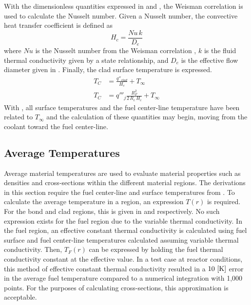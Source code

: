      With the dimensionless quantities expressed in  and
      , the Weisman correlation is used to calculate the Nusselt
      number. Given a Nusselt number, the convective heat transfer coefficient
      is defined as
      \begin{equation}
        \label{eq:hc}
        H_c = \frac{N\!u \, k}{D_e}
      \end{equation}
      where $Nu$ is the Nusselt number from the Weisman correlation
      , $k$ is the fluid thermal conductivity given by a state
      relationship, and $D_e$ is the effective flow diameter given in
      . Finally, the clad surface temperature is expressed.
      \begin{align}
        T_C &= \frac{q''_{clad}}{H_c} + T_{\infty} \\
        \label{eq:tc}
        T_C &= q'''_j \frac{R_F^2}{2\,R_c\,H_c} + T_{\infty}
      \end{align}
      With , all surface temperatures and the fuel center-line
      temperature have been related to $T_{\infty}$ and the calculation of these
      quantities may begin, moving from the coolant toward the fuel center-line.

  \subsection{Average Temperatures}
    \label{sec:average_temps}
    Average material temperatures are used to evaluate material properties such
    as densities and cross-sections within the different material regions. The
    derivations in this section require the fuel center-line and surface
    temperatures from . To calculate the average
    temperature in a region, an expression $T(r)$ is required. For the bond and
    clad regions, this is given in  and  respectively.
    No such expression exists for the fuel region due to the variable thermal
    conductivity. In the fuel region, an effective constant thermal conductivity
    is calculated using fuel surface and fuel center-line temperatures
    calculated assuming variable thermal conductivity. Then, $T_F(r)$ can be 
    expressed by holding the fuel thermal conductivity constant at the effective
    value. In a test case at reactor conditions, this method of effective 
    constant thermal conductivity resulted in a $10 \,\left[\text{{K}}\right]$ error in the 
    average fuel temperature compared to a numerical integration with 1,000
    points. For the purposes of calculating cross-sections, this approximation
    is acceptable.

